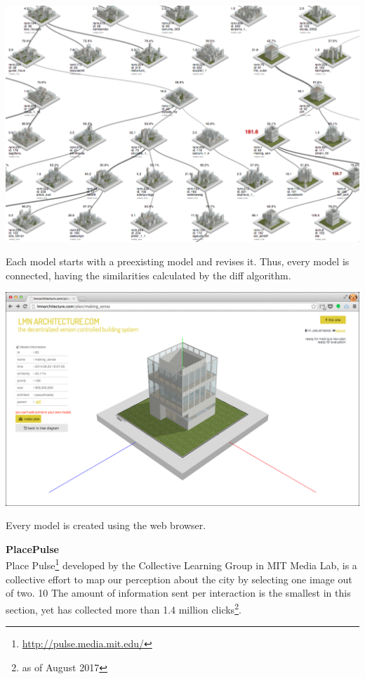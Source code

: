 \begin{marginfigure}[{0cm}]
  \includegraphics[width=\textwidth]{chapters/3/fig/lmn_000.png}               
  \caption[LMN:net work of models]{Each model starts with a preexisting model and revises it.
Thus, every model is connected, having the similarities calculated by the diff algorithm.}
  \label{fig:lnm_zoom}
\end{marginfigure}

\begin{marginfigure}[{0cm}]
  \includegraphics[width=\textwidth]{chapters/3/fig/lmn_006.png}               
  \caption[LMN: modeling inside the browser]{Every model is created using the web browser.}
  \label{fig:lnm_create}
\end{marginfigure}

\textbf{PlacePulse}\\
Place Pulse\footnote{\url{http://pulse.media.mit.edu/}}\cite{salesses2013collaborative} developed by the Collective Learning Group in MIT Media Lab, is a collective effort to map our perception about the city by selecting one image out of two. 10 The amount of information sent per interaction is the smallest in this section, yet has collected more than 1.4 million clicks\footnote{as of August 2017}.

